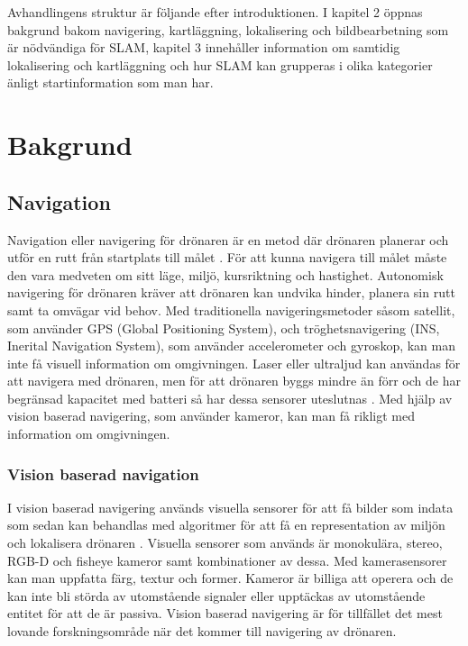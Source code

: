 Avhandlingens struktur är följande efter introduktionen. I kapitel 2 öppnas bakgrund bakom navigering, kartläggning, lokalisering och bildbearbetning som är nödvändiga för SLAM, kapitel 3 innehåller information om samtidig lokalisering och kartläggning och hur SLAM kan grupperas i olika kategorier änligt startinformation som man har.

\chapter{Bakgrund}

\section{Navigation}

Navigation eller navigering för drönaren är en metod där drönaren planerar och utför en rutt från startplats till målet \citep{geospatial}. För att kunna navigera till målet måste den vara medveten om sitt läge, miljö, kursriktning och hastighet. Autonomisk navigering för drönaren kräver att drönaren kan undvika hinder, planera sin rutt samt ta omvägar vid behov. Med traditionella navigeringsmetoder såsom satellit, som använder GPS (Global Positioning System), och tröghetsnavigering (INS, Inerital Navigation System), som använder accelerometer och gyroskop, kan man inte få visuell information om omgivningen. Laser eller ultraljud kan användas för att navigera med drönaren, men för att drönaren byggs mindre än förr och de har begränsad kapacitet med batteri så har dessa sensorer uteslutnas \citep{6385934}. Med hjälp av vision baserad navigering, som använder kameror, kan man få rikligt med information om omgivningen. 

\subsection{Vision baserad navigation}

I vision baserad navigering används visuella sensorer för att få bilder som indata som sedan kan behandlas med algoritmer för att få en representation av miljön och lokalisera drönaren \citep{geospatial}. Visuella sensorer som används är monokulära, stereo, RGB-D och fisheye kameror samt kombinationer av dessa. Med kamerasensorer kan man uppfatta färg, textur och former. Kameror är billiga att operera och de kan inte bli störda av utomstående signaler eller upptäckas av utomstående entitet för att de är passiva. Vision baserad navigering är för tillfället det mest lovande forskningsområde när det kommer till navigering av drönaren.

